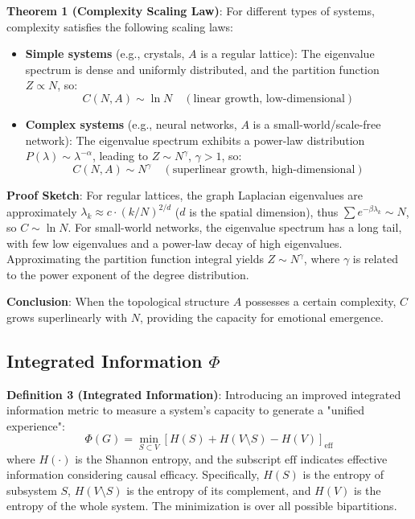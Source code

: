 \documentclass[12pt,a4paper]{article}
\theoremstyle{plain}
\begin{document}
\textbf{Theorem 1 (Complexity Scaling Law)}: For different types of systems, complexity satisfies the following scaling laws:
\begin{itemize}
    \item \textbf{Simple systems} (e.g., crystals, $A$ is a regular lattice): The eigenvalue spectrum is dense and uniformly distributed, and the partition function $Z \propto N$, so:
    \begin{equation}
    C(N,A) \sim \ln N \quad (\text{linear growth, low-dimensional})
    \end{equation}
    \item \textbf{Complex systems} (e.g., neural networks, $A$ is a small-world/scale-free network): The eigenvalue spectrum exhibits a power-law distribution $P(\lambda) \sim \lambda^{-\alpha}$, leading to $Z \sim N^\gamma$, $\gamma > 1$, so:
    \begin{equation}
    C(N,A) \sim N^\gamma \quad (\text{superlinear growth, high-dimensional})
    \end{equation}
\end{itemize}

\textbf{Proof Sketch}: For regular lattices, the graph Laplacian eigenvalues are approximately $\lambda_k \approx c \cdot (k/N)^{2/d}$ ($d$ is the spatial dimension), thus $\sum e^{-\beta \lambda_k} \sim N$, so $C \sim \ln N$. For small-world networks, the eigenvalue spectrum has a long tail, with few low eigenvalues and a power-law decay of high eigenvalues. Approximating the partition function integral yields $Z \sim N^\gamma$, where $\gamma$ is related to the power exponent of the degree distribution.

\textbf{Conclusion}: When the topological structure $A$ possesses a certain complexity, $C$ grows superlinearly with $N$, providing the capacity for emotional emergence.

\subsection{Integrated Information $\Phi$}

\textbf{Definition 3 (Integrated Information)}: Introducing an improved integrated information metric to measure a system's capacity to generate a "unified experience":
\begin{equation}
\Phi(G) = \min_{S \subset V} \left[ H(S) + H(V \setminus S) - H(V) \right]_{\text{eff}}
\end{equation}
where $H(\cdot)$ is the Shannon entropy, and the subscript $\text{eff}$ indicates effective information considering causal efficacy. Specifically, $H(S)$ is the entropy of subsystem $S$, $H(V \setminus S)$ is the entropy of its complement, and $H(V)$ is the entropy of the whole system. The minimization is over all possible bipartitions.
\end{document}
